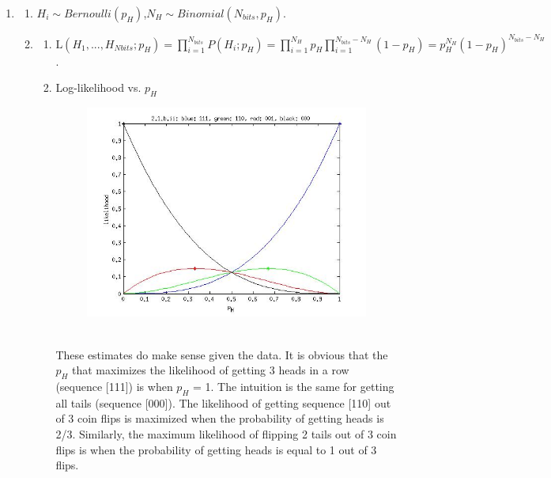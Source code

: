 \documentclass{article}
\begin{document}
\begin{enumerate}
	\item
	\begin{enumerate}
		\item $H_{i}\sim{}Bernoulli(p_{H})$,\hspace{2em}$N_{H}\sim{}Binomial(N_{bits}, p_{H})$.
		\item
		\begin{enumerate}
			\item 
			$\text{L}(H_{1},		\text{...},H_{Nbits};p_{H})=\prod_{i=1}^{N_{bits}}P(H_{i};p_{H})=\prod_{i=1}^{N_{H}}p_{H}\prod_{i=1}^{N_{bits}-N_{H}}(1-p_{H})=p_H^{N_{H}}(1-p_{H})^{N_{bits}-N_{H}}$.
			\item Log-likelihood vs. $p_H$
			\begin{figure}[h]
			\includegraphics[scale=0.75]{hw2_ques2_1_b_ii}\\
			\end{figure}
			\vspace{0.0001em}\\
			These estimates do make sense given the data. It is obvious that the $p_H$ that maximizes the likelihood of getting 3 heads in a row (sequence [111]) is when $p_H$ = 1. The intuition is the same for getting all tails (sequence [000]). The likelihood of getting sequence [110] out of 3 coin flips is maximized when the probability of getting heads is 2/3. Similarly, the maximum likelihood of flipping 2 tails out of 3 coin flips is when the probability of getting heads is equal to 1 out of 3 flips.
			\vspace{0.5em}\\

\end{enumerate}
\end{enumerate}
\end{enumerate}
\end{document}
